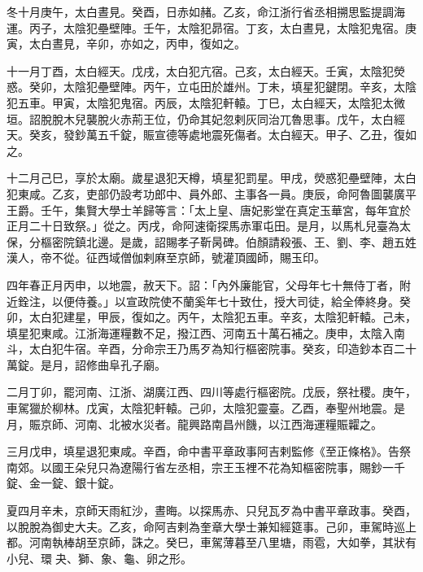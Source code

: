 \begin{pinyinscope}
 冬十月庚午，太白晝見。癸酉，日赤如赭。乙亥，命江浙行省丞相搠思監提調海運。丙子，太陰犯壘壁陣。壬午，太陰犯昴宿。丁亥，太白晝見，太陰犯鬼宿。庚寅，太白晝見，辛卯，亦如之，丙申，復如之。



 十一月丁酉，太白經天。戊戌，太白犯亢宿。己亥，太白經天。壬寅，太陰犯熒惑。癸卯，太陰犯壘壁陣。丙午，立屯田於雄州。丁未，填星犯鍵閉。辛亥，太陰犯五車。甲寅，太陰犯鬼宿。丙辰，太陰犯軒轅。丁巳，太白經天，太陰犯太微垣。詔脫脫木兒襲脫火赤荊王位，仍命其妃忽剌灰同治兀魯思事。戊午，太白經天。癸亥，發鈔萬五千錠，賑宣德等處地震死傷者。太白經天。甲子、乙丑，復如之。



 十二月己巳，享於太廟。歲星退犯天樽，填星犯罰星。甲戌，熒惑犯壘壁陣，太白犯東咸。乙亥，吏部仍設考功郎中、員外郎、主事各一員。庚辰，命阿魯圖襲廣平王爵。壬午，集賢大學士羊歸等言：「太上皇、唐妃影堂在真定玉華宮，每年宜於正月二十日致祭。」從之。丙戌，命阿速衛探馬赤軍屯田。是月，以馬札兒臺為太保，分樞密院鎮北邊。是歲，詔賜孝子靳昺碑。伯顏請殺張、王、劉、李、趙五姓漢人，帝不從。征西域僧伽剌麻至京師，號灌頂國師，賜玉印。



 四年春正月丙申，以地震，赦天下。詔：「內外廉能官，父母年七十無侍丁者，附近銓注，以便侍養。」以宣政院使不蘭奚年七十致仕，授大司徒，給全俸終身。癸卯，太白犯建星，甲辰，復如之。丙午，太陰犯五車。辛亥，太陰犯軒轅。己未，填星犯東咸。江浙海運糧數不足，撥江西、河南五十萬石補之。庚申，太陰入南斗，太白犯牛宿。辛酉，分命宗王乃馬歹為知行樞密院事。癸亥，印造鈔本百二十萬錠。是月，詔修曲阜孔子廟。



 二月丁卯，罷河南、江浙、湖廣江西、四川等處行樞密院。戊辰，祭社稷。庚午，車駕獵於柳林。戊寅，太陰犯軒轅。己卯，太陰犯靈臺。乙酉，奉聖州地震。是月，賑京師、河南、北被水災者。龍興路南昌州饑，以江西海運糧賑糶之。



 三月戊申，填星退犯東咸。辛酉，命中書平章政事阿吉剌監修《至正條格》。告祭南郊。以國王朵兒只為遼陽行省左丞相，宗王玉裡不花為知樞密院事，賜鈔一千錠、金一錠、銀十錠。



 夏四月辛未，京師天雨紅沙，晝晦。以探馬赤、只兒瓦歹為中書平章政事。癸酉，以脫脫為御史大夫。乙亥，命阿吉剌為奎章大學士兼知經筵事。己卯，車駕時巡上都。河南執棒胡至京師，誅之。癸巳，車駕薄暮至八里塘，雨雹，大如拳，其狀有小兒、環夬、獅、象、龜、卵之形。




\end{pinyinscope}
